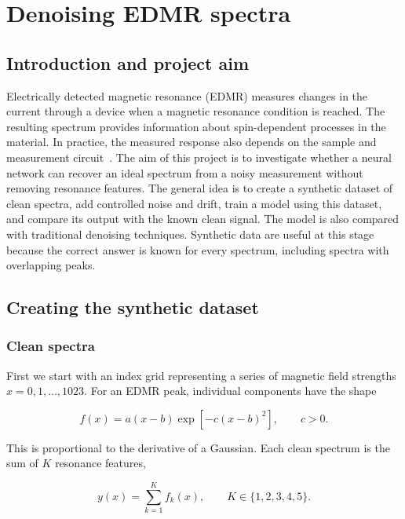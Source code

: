 \chapter{Denoising EDMR spectra}\label{ch:edmr}

\section{Introduction and project aim}

Electrically detected magnetic resonance (EDMR) measures changes in the current through a device when a magnetic resonance condition is reached. The resulting spectrum provides information about spin-dependent processes in the material. In practice, the measured response also depends on the sample and measurement circuit~\cite{leite2013}. The aim of this project is to investigate whether a neural network can recover an ideal spectrum from a noisy measurement without removing resonance features. The general idea is to create a synthetic dataset of clean spectra, add controlled noise and drift, train a model using this dataset, and compare its output with the known clean signal. The model is also compared with traditional denoising techniques. Synthetic data are useful at this stage because the correct answer is known for every spectrum, including spectra with overlapping peaks.

\section{Creating the synthetic dataset}\label{sec:data}

\subsection{Clean spectra}

First we start with an index grid representing a series of magnetic field strengths $x=0,1,\ldots,1023$. For an EDMR peak, individual components have the shape

\begin{equation}
 f(x)=a(x-b)\exp\left[-c(x-b)^2\right],\qquad c>0.
 \label{eq:peak}
\end{equation}

This is proportional to the derivative of a Gaussian. Each clean spectrum is the sum of $K$ resonance features,

\begin{equation}
 y(x)=\sum_{k=1}^{K} f_k(x),\qquad K\in\{1,2,3,4,5\}.
\end{equation}

